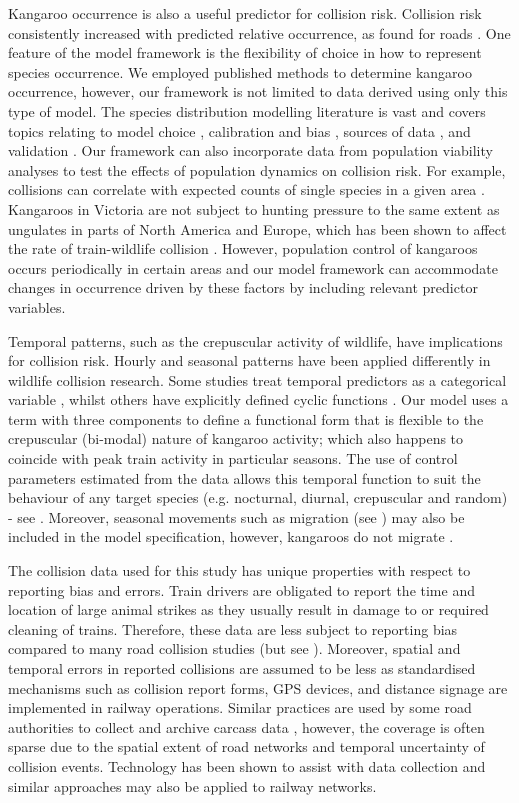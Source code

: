 Kangaroo occurrence is also a useful predictor for collision risk. Collision risk consistently increased with predicted relative occurrence, as found for roads \citep{lao11,roge09}.  One feature of the model framework is the flexibility of choice in how to represent species occurrence.  We employed published methods to determine kangaroo occurrence, however, our framework is not limited to data derived using only this type of model.  The species distribution modelling literature is vast and covers topics relating to model choice \citep{guil15}, calibration and bias \citep{phil10}, sources of data \citep{vans13}, and validation \citep{chiv14}.  Our framework can also incorporate data from population viability analyses to test the effects of population dynamics on collision risk. For example, collisions can correlate with expected counts of single species in a given area \citep{skor13}.  Kangaroos in Victoria are not subject to hunting pressure to the same extent as ungulates in parts of North America and Europe, which has been shown to affect the rate of train-wildlife collision \citep{seil05}.  However, population control of kangaroos occurs periodically in certain areas and our model framework can accommodate changes in occurrence driven by these factors by including relevant predictor variables. 

Temporal patterns, such as the crepuscular activity of wildlife, have implications for collision risk. Hourly and seasonal patterns have been applied differently in wildlife collision research.  Some studies treat temporal predictors as a categorical variable \citep{duss06}, whilst others have explicitly defined cyclic functions \citep{thur15}.  Our model uses a term with three components to define a functional form that is flexible to the crepuscular (bi-modal) nature of kangaroo activity; which also happens to coincide with peak train activity in particular seasons. The use of control parameters estimated from the data allows this temporal function to suit the behaviour of any target species (e.g. nocturnal, diurnal, crepuscular and random) - see .  Moreover, seasonal movements such as migration (see \cite{neum12}) may also be included in the model specification, however, kangaroos do not migrate \citep{daws12}.

The collision data used for this study has unique properties with respect to reporting bias and errors.  Train drivers are obligated to report the time and location of large animal strikes as they usually result in damage to or required cleaning of trains.  Therefore, these data are less subject to reporting bias compared to many road collision studies (but see \cite{snow15}).  Moreover, spatial and temporal errors in reported collisions are assumed to be less as standardised mechanisms such as collision report forms, GPS devices, and distance signage are implemented in railway operations. Similar practices are used by some road authorities to collect and archive carcass data \citep{huij07a}, however, the coverage is often sparse due to the spatial extent of road networks and temporal uncertainty of collision events.  Technology has been shown to assist with data collection \citep{olso14,shil15b} and similar approaches may also be applied to railway networks.

